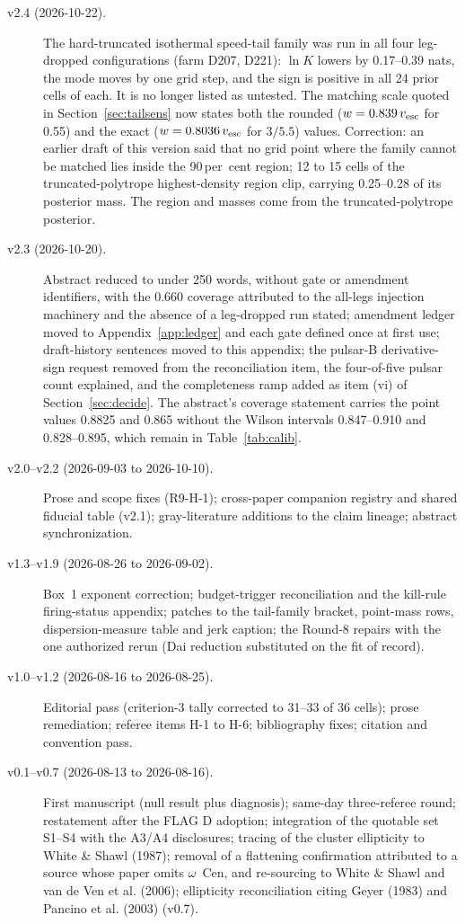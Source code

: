 \documentclass[11pt]{article}
\newcommand{\ocen}{$\omega$~Cen}
\newcommand{\lnK}{\ensuremath{\ln K}}
\begin{document}
\begin{description}
\item[v2.4 (2026-10-22).] The hard-truncated isothermal speed-tail family was run in all four leg-dropped configurations (farm D207, D221): \lnK{} lowers by 0.17--0.39 nats, the mode moves by one grid step, and the sign is positive in all 24 prior cells of each. It is no longer listed as untested. The matching scale quoted in Section~\ref{sec:tailsens} now states both the rounded ($w = 0.839\,v_{\rm esc}$ for 0.55) and the exact ($w = 0.8036\,v_{\rm esc}$ for $3/5.5$) values. Correction: an earlier draft of this version said that no grid point where the family cannot be matched lies inside the 90\,per~cent region; 12 to 15 cells of the truncated-polytrope highest-density region clip, carrying 0.25--0.28 of its posterior mass. The region and masses come from the truncated-polytrope posterior.
\item[v2.3 (2026-10-20).] Abstract reduced to under 250 words, without gate or amendment identifiers, with the 0.660 coverage attributed to the all-legs injection machinery and the absence of a leg-dropped run stated; amendment ledger moved to Appendix~\ref{app:ledger} and each gate defined once at first use; draft-history sentences moved to this appendix; the pulsar-B derivative-sign request removed from the reconciliation item, the four-of-five pulsar count explained, and the completeness ramp added as item (vi) of Section~\ref{sec:decide}. The abstract's coverage statement carries the point values 0.8825 and 0.865 without the Wilson intervals 0.847--0.910 and 0.828--0.895, which remain in Table~\ref{tab:calib}.
\item[v2.0--v2.2 (2026-09-03 to 2026-10-10).] Prose and scope fixes (R9-H-1); cross-paper companion registry and shared fiducial table (v2.1); gray-literature additions to the claim lineage; abstract synchronization.
\item[v1.3--v1.9 (2026-08-26 to 2026-09-02).] Box~1 exponent correction; budget-trigger reconciliation and the kill-rule firing-status appendix; patches to the tail-family bracket, point-mass rows, dispersion-measure table and jerk caption; the Round-8 repairs with the one authorized rerun (Dai reduction substituted on the fit of record).
\item[v1.0--v1.2 (2026-08-16 to 2026-08-25).] Editorial pass (criterion-3 tally corrected to 31--33 of 36 cells); prose remediation; referee items H-1 to H-6; bibliography fixes; citation and convention pass.
\item[v0.1--v0.7 (2026-08-13 to 2026-08-16).] First manuscript (null result plus diagnosis); same-day three-referee round; restatement after the FLAG D adoption; integration of the quotable set S1--S4 with the A3/A4 disclosures; tracing of the cluster ellipticity to White \& Shawl (1987); removal of a flattening confirmation attributed to a source whose paper omits \ocen{}, and re-sourcing to White \& Shawl and van de Ven et al. (2006); ellipticity reconciliation citing Geyer (1983) and Pancino et al. (2003) (v0.7).
\end{description}
\end{document}
